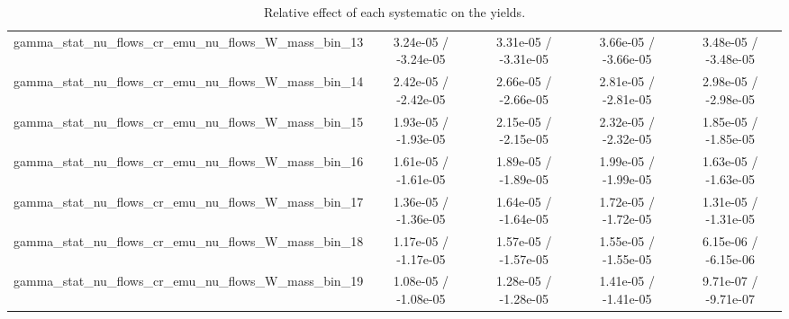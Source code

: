\documentclass[10pt]{article}
\begin{document}
\begin{table}[htbp]
\begin{center}
\begin{tabular}{|c|c|c|c|c|}
  gamma_stat_nu_flows_cr_emu_nu_flows_W_mass_bin_13 & 3.24e-05 / -3.24e-05 & 3.31e-05 / -3.31e-05 & 3.66e-05 / -3.66e-05 & 3.48e-05 / -3.48e-05 \\ 
  gamma_stat_nu_flows_cr_emu_nu_flows_W_mass_bin_14 & 2.42e-05 / -2.42e-05 & 2.66e-05 / -2.66e-05 & 2.81e-05 / -2.81e-05 & 2.98e-05 / -2.98e-05 \\ 
  gamma_stat_nu_flows_cr_emu_nu_flows_W_mass_bin_15 & 1.93e-05 / -1.93e-05 & 2.15e-05 / -2.15e-05 & 2.32e-05 / -2.32e-05 & 1.85e-05 / -1.85e-05 \\ 
  gamma_stat_nu_flows_cr_emu_nu_flows_W_mass_bin_16 & 1.61e-05 / -1.61e-05 & 1.89e-05 / -1.89e-05 & 1.99e-05 / -1.99e-05 & 1.63e-05 / -1.63e-05 \\ 
  gamma_stat_nu_flows_cr_emu_nu_flows_W_mass_bin_17 & 1.36e-05 / -1.36e-05 & 1.64e-05 / -1.64e-05 & 1.72e-05 / -1.72e-05 & 1.31e-05 / -1.31e-05 \\ 
  gamma_stat_nu_flows_cr_emu_nu_flows_W_mass_bin_18 & 1.17e-05 / -1.17e-05 & 1.57e-05 / -1.57e-05 & 1.55e-05 / -1.55e-05 & 6.15e-06 / -6.15e-06 \\ 
  gamma_stat_nu_flows_cr_emu_nu_flows_W_mass_bin_19 & 1.08e-05 / -1.08e-05 & 1.28e-05 / -1.28e-05 & 1.41e-05 / -1.41e-05 & 9.71e-07 / -9.71e-07 \\ 
\hline 
\end{tabular} 
\caption{Relative effect of each systematic on the yields.} 
\end{center} 
\end{table} 
\end{document}

